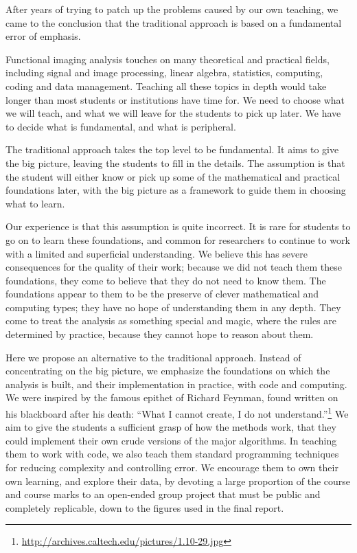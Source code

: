 After years of trying to patch up the problems caused by our own teaching, we
came to the conclusion that the traditional approach is based on a fundamental
error of emphasis.

Functional imaging analysis touches on many theoretical and practical fields,
including signal and image processing, linear algebra, statistics, computing,
coding and data management.  Teaching all these topics in depth would take
longer than most students or institutions have time for.  We need to choose
what we will teach, and what we will leave for the students to pick up later.
We have to decide what is fundamental, and what is peripheral.

The traditional approach takes the top level to be fundamental.  It aims to
give the big picture, leaving the students to fill in the details. The
assumption is that the student will either know or pick up some of the
mathematical and practical foundations later, with the big picture as a
framework to guide them in choosing what to learn.

Our experience is that this assumption is quite incorrect.  It is rare for
students to go on to learn these foundations, and common for researchers to
continue to work with a limited and superficial understanding.  We believe
this has severe consequences for the quality of their work; because we did not
teach them these foundations, they come to believe that they do not need to
know them.  The foundations appear to them to be the preserve of clever
mathematical and computing types; they have no hope of understanding them in
any depth.  They come to treat the analysis as something special and magic,
where the rules are determined by practice, because they cannot hope to reason
about them.

Here we propose an alternative to the traditional approach.  Instead of
concentrating on the big picture, we emphasize the foundations on which the
analysis is built, and their implementation in practice, with code and
computing.  We were inspired by the famous epithet of Richard Feynman, found
written on his blackboard after his death: ``What I cannot create, I do not
understand.''\footnote{\url{http://archives.caltech.edu/pictures/1.10-29.jpg}}
We aim to give the students a sufficient grasp of how the methods work, that
they could implement their own crude versions of the major algorithms.  In
teaching them to work with code, we also teach them standard programming
techniques for reducing complexity and controlling error.  We encourage them
to own their own learning, and explore their data, by devoting a large
proportion of the course and course marks to an open-ended group project that
must be public and completely replicable, down to the figures used in the
final report.

